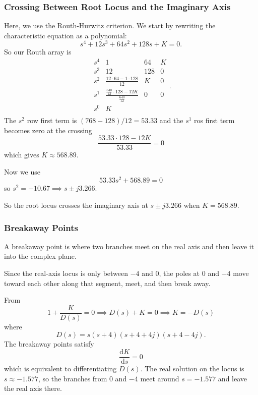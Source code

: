 \subsubsection{Crossing Between Root Locus and the Imaginary Axis}
Here, we use the Routh-Hurwitz criterion.
We start by rewriting the characteristic equation as a polynomial:
\begin{equation*}
  s^{4} + 12 s^3 + 64s^2 + 128s + K = 0
.\end{equation*}
So our Routh array is
\begin{equation*}
  \begin{array}{c|cccc}
    s^{4} & 1 & 64 & K\\
  s^3 & 12 & 128 & 0\\
  s^2 & \frac{12 \cdot 64 - 1 \cdot 128}{12} & K & 0\\
  s^{1} & \frac{\frac{640}{12} \cdot 128 - 12K}{\frac{640}{12}} & 0 & 0\\
  s^{0} & K &  & \\
  \end{array}
.\end{equation*}
The $s^2$ row first term is $(768 - 128) / 12 = \num{53,33}$ and the $s^{1}$ ros first term becomes zero at the crossing 
\begin{equation*}
  \frac{\num{53,33} \cdot 128 - 12K}{\num{53,33}} = 0
\end{equation*}
which gives $K \approx \num{568,89}$.

Now we use
\begin{equation*}
  \num{53,33} s^2 + \num{568,89}  = 0
\end{equation*}
so $s^2 = \num{-10,67} \implies s \pm j \num{3,266}$.

So the root locus crosses the imaginary axis at $s \pm j \num{3,266}$ when $K = \num{568,89}$.

\subsubsection{Breakaway Points}
A breakaway point is where two branches meet on the real axis and then leave it into the complex plane.

Since the real-axis locus is only between $-4$ and 0, the poles at 0 and $-4$ move toward each other along that segment, meet, and then break away.

From
\begin{equation*}
  1 + \frac{K}{D(s)} = 0 \implies D(s) + K = 0 \implies K = -D(s)
\end{equation*}
where
\begin{equation*}
  D(s) = s(s+4)(s+4+4j)(s+4-4j)
.\end{equation*}
The breakaway points satisfy
\begin{equation*}
  \frac{\mathrm{d}K}{\mathrm{d}s} = 0
\end{equation*}
which is equivalent to differentiating $D(s)$.
The real solution on the locus is $s\approx \num{-1,577}$, so the branches from 0 and $-4$ meet around $s = \num{-1,577}$ and leave the real axis there. 

